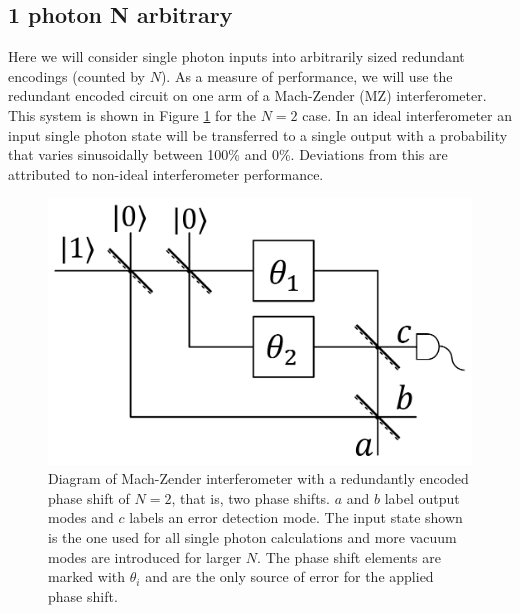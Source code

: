 \documentclass[aps,pra,twocolumn,superscriptaddress,numerical,floatfix]{revtex4-1}
\begin{document}
	
\subsection{1 photon N arbitrary \label{1 photon N arbitrary}}
	
Here we will consider single photon inputs into arbitrarily sized redundant encodings (counted by $N$).  As a measure of performance, we will use the redundant encoded circuit on one arm of a Mach-Zender (MZ) interferometer.  This system is shown in Figure \ref{fig:MZ_setup} for the $N=2$ case.  In an ideal interferometer an input single photon state will be transferred to a single output with a probability that varies sinusoidally between 100\% and 0\%.  Deviations from this are attributed to non-ideal interferometer performance. 
\begin{figure}[tbh]
	\includegraphics[width=\columnwidth]{2N1P.png}
	\caption{\label{fig:MZ_setup}Diagram of Mach-Zender interferometer with a redundantly encoded phase shift of $N=2$, that is, two phase shifts. $a$ and $b$ label output modes and $c$ labels an error detection mode. The input state shown is the one used for all single photon calculations and more vacuum modes are introduced for larger $N$. The phase shift elements are marked with $\theta_{i}$ and are the only source of error for the applied phase shift.}
\end{figure}
	
\end{document}

